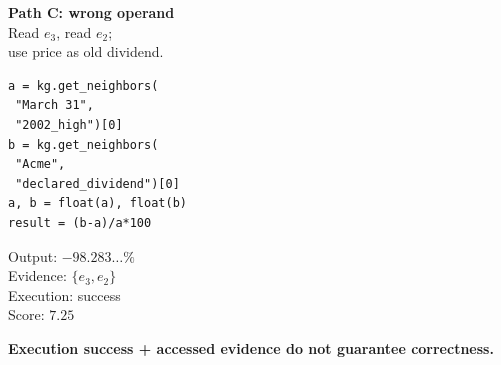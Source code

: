 \begin{minipage}[t]{0.315\linewidth}
\centering\small\textbf{Path C: wrong operand}\\
\scriptsize Read $e_3$, read $e_2$;\\use price as old dividend.\par
\begin{lstlisting}[basicstyle=\ttfamily\scriptsize]
a = kg.get_neighbors(
 "March 31",
 "2002_high")[0]
b = kg.get_neighbors(
 "Acme",
 "declared_dividend")[0]
a, b = float(a), float(b)
result = (b-a)/a*100
\end{lstlisting}
\scriptsize Output: $-98.283\ldots\%$\\
Evidence: $\{e_3,e_2\}$\\
Execution: success\\
Score: $7.25$
\end{minipage}
\begin{center}
\small\textbf{Execution success + accessed evidence do not guarantee correctness.}
\end{center}
